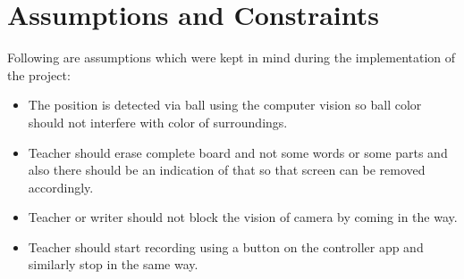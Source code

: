 


\section{Assumptions and Constraints}

Following are assumptions which were kept in mind during the implementation of the project:

\begin{itemize}

\item The position is detected via ball using the computer vision so ball color should not interfere with color of surroundings.

\item Teacher should erase complete board and not some words or some parts and also there should be an indication of that so that screen can be removed accordingly.

\item Teacher or writer should not block the vision of camera by coming in the way.

\item Teacher should start recording using a button on the controller app and similarly stop in the same way.

\end{itemize}
\bigskip


